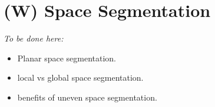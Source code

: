 \section{(W) Space Segmentation}\label{s:spaceSegmentation}
    \emph{To be done here:}
    \begin{itemize}
        \item Planar space segmentation.
        \item local vs global space segmentation.
        \item benefits of uneven space segmentation.
    \end{itemize}